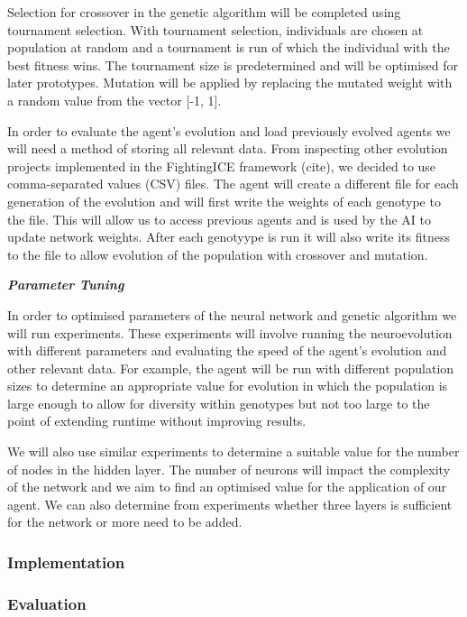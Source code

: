 \documentclass[12pt,a4paper]{article}
\begin{document}
Selection for crossover in the genetic algorithm will be completed using tournament selection. With tournament selection, individuals are chosen at population at random and a tournament is run of which the individual with the best fitness wins. The tournament size is predetermined and will be optimised for later prototypes. Mutation will be applied by replacing the mutated weight with a random value from the vector [-1, 1]. 

In order to evaluate the agent's evolution and load previously evolved agents we will need a method of storing all relevant data. From inspecting other evolution projects implemented in the FightingICE framework (cite), we decided to use comma-separated values (CSV) files. The agent will create a different file for each generation of the evolution and will first write the weights of each genotype to the file. This will allow us to access previous agents and is used by the AI to update network weights. After each genotyype is run it will also write its fitness to the file to allow evolution of the population with crossover and mutation.

\vspace{5mm}

\textbf{\textit{Parameter Tuning}}

\vspace{3mm}

In order to optimised parameters of the neural network and genetic algorithm we will run experiments. These experiments will involve running the neuroevolution with different parameters and evaluating the speed of the agent's evolution and other relevant data. For example, the agent will be run with different population sizes to determine an appropriate value for evolution in which the population is large enough to allow for diversity within genotypes but not too large to the point of extending runtime without improving results. 

We will also use similar experiments to determine a suitable value for the number of nodes in the hidden layer. The number of neurons will impact the complexity of the network and we aim to find an optimised value for the application of our agent. We can also determine from experiments whether three layers is sufficient for the network or more need to be added. 
\subsubsection{Implementation}
\subsubsection{Evaluation}
\end{document}
